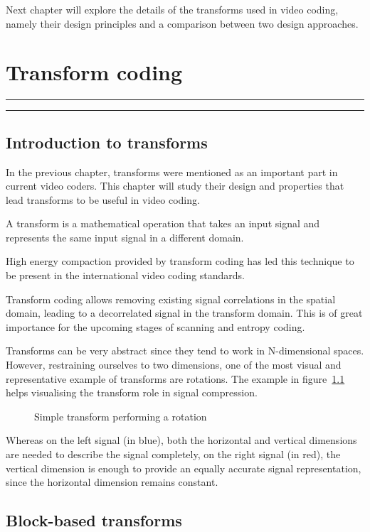 \documentclass[11pt,a4paper,openright,twoside]{book}
\providecommand{\chaptertoc}{
	\startcontents[chapters]
	\hrule
	\vspace{1em}
	\printcontents[chapters]{}{1}{{\bf\large Contents}}
	\hrule
}
\numberwithin{equation}{section} %
\begin{document}
Next chapter will explore the details of the transforms used in video
coding, namely their design principles and a comparison between two
design approaches.

\chapter{Transform coding}
\label{cha:transform_coding}
\chaptertoc

\section{Introduction to transforms}
\label{sec:introduction_to_transforms}

In the previous chapter, transforms were mentioned as an important part
in current video coders.
This chapter will study their design and properties that lead transforms
to be useful in video coding.

A transform is a mathematical operation that takes an input signal and
represents the same input signal in a different domain.

High energy compaction provided by transform coding has led this
technique to be present in the international video coding standards.

Transform coding allows removing existing signal correlations in the
spatial domain, leading to a decorrelated signal in the transform
domain.
This is of great importance for the upcoming stages of scanning and
entropy coding.

Transforms can be very abstract since they tend to work in N-dimensional
spaces.
However, restraining ourselves to two dimensions, one of the most visual
and representative example of transforms are rotations.
The example in figure~\ref{fig:transform_rotation} helps visualising the
transform role in signal compression.

\begin{figure}[h]
	\centering
	
	\caption{Simple transform performing a rotation}
	\label{fig:transform_rotation}
\end{figure}

Whereas on the left signal (in blue), both the horizontal and vertical
dimensions are needed to describe the signal completely, on the right
signal (in red), the vertical dimension is enough to provide an equally
accurate signal representation, since the horizontal dimension remains
constant.

\section{Block-based transforms}
\label{sec:block_based_transforms}
\end{document}
